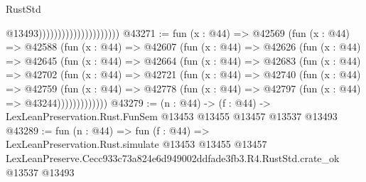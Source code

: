 \begin{lexlean}{RustStd}
\begin{coremodule}
                                              @13493)))))))))))))))))))))
@43271 := fun (x : @44) =>
  @42569
    (fun (x : @44) =>
    @42588
      (fun (x : @44) =>
      @42607
        (fun (x : @44) =>
        @42626
          (fun (x : @44) =>
          @42645
            (fun (x : @44) =>
            @42664
              (fun (x : @44) =>
              @42683
                (fun (x : @44) =>
                @42702
                  (fun (x : @44) =>
                  @42721
                    (fun (x : @44) =>
                    @42740
                      (fun (x : @44) =>
                      @42759
                        (fun (x : @44) =>
                        @42778 (fun (x : @44) => @42797 (fun (x : @44) => @43244)))))))))))))
@43279 := (n : @44) ->
  (f : @44) -> LexLeanPreservation.Rust.FunSem @13453 @13455 @13457 @13537 @13493
@43289 := fun (n : @44) =>
  fun (f : @44) =>
  LexLeanPreservation.Rust.simulate
    @13453
    @13455
    @13457
    LexLeanPreserve.Cecc933c73a824e6d949002ddfade3fb3.R4.RustStd.crate_ok
    @13537
    @13493
\end{coremodule}
\end{lexlean}
